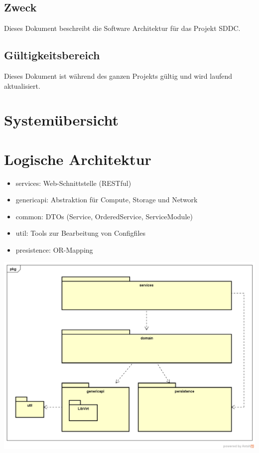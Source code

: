 \documentclass[11pt]{scrartcl}
\begin{document}
\newpage
\tableofcontents
\newpage

\subsection{Zweck}
Dieses Dokument beschreibt die Software Architektur für das Projekt SDDC.
\subsection{Gültigkeitsbereich}
Dieses Dokument ist während des ganzen Projekts gültig und wird laufend aktualisiert.

\newpage

\section{Systemübersicht}

\section{Logische Architektur}
\begin{itemize}
	\item services: Web-Schnittstelle (RESTful)
	\item genericapi: Abstraktion für Compute, Storage und Network
	\item common: DTOs (Service, OrderedService, ServiceModule)
	\item util: Tools zur Bearbeitung von Configfiles
	\item presistence: OR-Mapping
\end{itemize}

\begin{center}
\includegraphics[width=\textwidth]{LogischeSicht}
\end{center}
\end{document}
